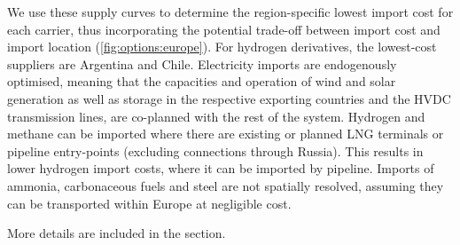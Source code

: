 We use these supply curves to determine the region-specific lowest import cost
for each carrier, thus incorporating the potential trade-off between import cost
and import location (\cref{fig:options:europe}). For hydrogen derivatives, the
lowest-cost suppliers are Argentina and Chile.
Electricity imports are
endogenously optimised, meaning that the capacities and operation of wind and
solar generation as well as storage in the respective exporting countries and
the HVDC transmission lines, are co-planned with the rest of the system.
Hydrogen and methane can be imported where there are existing or planned LNG
terminals or pipeline entry-points (excluding connections through Russia). This
results in lower hydrogen import costs, where it can be imported by pipeline.
Imports of ammonia, carbonaceous fuels and steel are not spatially resolved,
assuming they can be transported within Europe at negligible cost.

More details are included in the  section.







